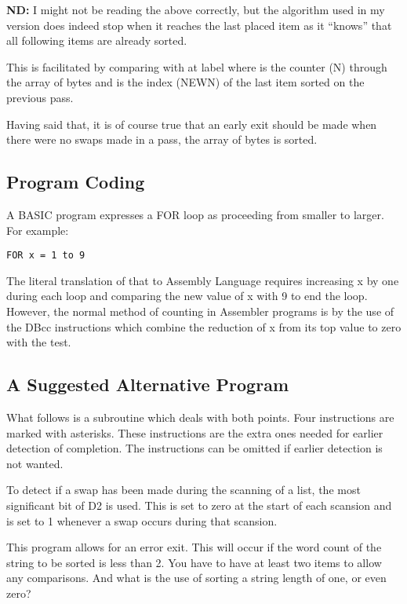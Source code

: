 \textbf{ND:} I might not be reading the above correctly, but the algorithm used in my version does indeed stop when it reaches the last placed item as it ``knows'' that all following items are already sorted.

This is facilitated by comparing  with  at label  where  is the counter (N) through the array of bytes and  is the index (NEWN) of the last item sorted on the previous pass.

Having said that, it is of course true that an early exit should be made when there were no swaps made in a pass, the array of bytes is sorted.


\subsection{Program Coding}

A BASIC program expresses a FOR loop as proceeding from smaller to larger. For example:

\begin{lstlisting}[firstnumber=1,caption={SuberBasic FOR Statement}]
FOR x = 1 to 9
\end{lstlisting}


The literal translation of that to Assembly Language requires increasing x by one during each loop and comparing the new value of x with 9 to end the loop. However, the normal method of counting in Assembler programs is by the use of the DBcc instructions which combine the reduction of x from its top value to zero with the test.


\subsection{A Suggested Alternative Program}

What follows is a subroutine which deals with both points. Four instructions are marked with asterisks. These instructions are the extra ones needed for earlier detection of completion. The instructions can be omitted if earlier detection is not wanted. 

To detect if a swap has been made during the scanning of a list, the most significant bit of D2 is used. This is set to zero at the start of each scansion and is set to 1 whenever a swap occurs during that scansion.

This program allows for an error exit. This will occur if the word count of
the string to be sorted is less than 2. You have to have at least two items
to allow any comparisons. And what is the use of sorting a string length of
one, or even zero?

